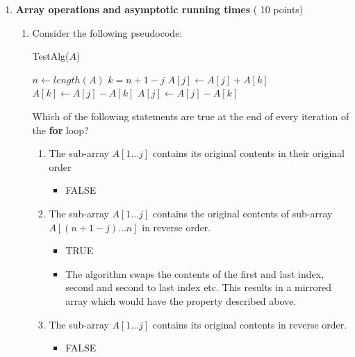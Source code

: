 \documentclass[11pt]{article}
\newcommand{\floor}[1]{\lfloor {#1} \rfloor}
\begin{document}
\newpage
\begin{enumerate}
    \color{black}

  

\item \textbf{Array operations and asymptotic running times} ( 10 points) 
      \begin{enumerate}
      \item 
   Consider the following pseudocode:

    \begin{algorithm}[H]
      \caption{TestAlg($A$)} 
      $n \gets length(A)$ \;
      \For{$j\gets 1$ to $\floor{\frac n 2}$} 
      {
        $k= n+1-j$\;
        $ A[j] \gets A[j]+A[k]$     \;
        $ A[k] \gets A[j]-A[k] $ \;
        $A[j] \gets A[j]-A[k]$ \;
      }
    \end{algorithm}


Which of the following statements are true at the end of every iteration of the \textbf{for} loop?
\begin{enumerate}
\item The sub-array $A[1\ldots j]$ contains its original contents in
  their original
  order 

  \begin{itemize}
      \color{teal}
      \item FALSE 
  \end{itemize}

\item The sub-array $A[1\ldots j]$ contains the original contents of
  sub-array \\
  $A[(n+1-j)\ldots n]$ in reverse order.

  \begin{itemize}
      \color{teal}
      \item TRUE
      \item The algorithm swaps the contents of the first and last index, second and second to last index etc. This results in a mirrored array which would have the property described above.
  \end{itemize}

\item The sub-array $A[1\ldots j]$
  contains its original contents in reverse order.

  \begin{itemize}
      \color{teal}
      \item FALSE 
  \end{itemize}


\end{enumerate}
\end{enumerate}
\end{enumerate}
\end{document}
